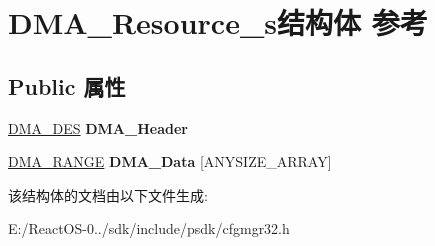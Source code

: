 \hypertarget{struct_d_m_a___resource__s}{}\section{D\+M\+A\+\_\+\+Resource\+\_\+s结构体 参考}
\label{struct_d_m_a___resource__s}
\subsection*{Public 属性}
\begin{DoxyCompactItemize}
\item 
\mbox{\label{struct_d_m_a___resource__s_ad8ea1133dd415076f18cb1a1e9fba9c3}} 
\hyperlink{struct_d_m_a___des__s}{D\+M\+A\+\_\+\+D\+ES} {\bfseries D\+M\+A\+\_\+\+Header}
\item 
\mbox{\label{struct_d_m_a___resource__s_a18d8db32b120aca4ee0b5cf8a0c3b86d}} 
\hyperlink{struct_d_m_a___range__s}{D\+M\+A\+\_\+\+R\+A\+N\+GE} {\bfseries D\+M\+A\+\_\+\+Data} \mbox{[}A\+N\+Y\+S\+I\+Z\+E\+\_\+\+A\+R\+R\+AY\mbox{]}
\end{DoxyCompactItemize}


该结构体的文档由以下文件生成\+:\begin{DoxyCompactItemize}
\item 
E\+:/\+React\+O\+S-\/0../sdk/include/psdk/cfgmgr32.\+h\end{DoxyCompactItemize}
